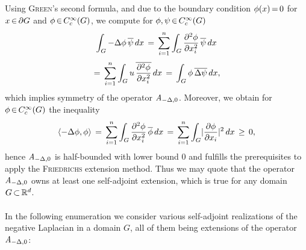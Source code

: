 \documentclass[11pt,twoside]{article}
\def\G{G}
\begin{document}
\begin{itemize}[leftmargin=9mm]
\subparagraph{} %
Using \textsc{Green}'s second formula,
and due to the boundary condition $\phi(x) {\,=\,} 0$ for $x \xeof \partial \G$
and $\phi \xeof \TF$,
we compute for $\phi,\psi \xeof \TF$
\[
\int_{\G} -\Delta \phi \, \overline{\psi} \, dx
\=
\sum_{i=1}^n \int_{\G}
\frac{\partial^2 \phi}{\partial x_i^2} \, \overline{\psi} \, dx
\]
\[
\=
\sum_{i=1}^n \int_{\G}
u \, \overline{\frac{\partial^2 \phi}{\partial x_i^2}} \, dx 
\=
\int_{\G} \phi \, \overline{\Delta \psi} \, dx,
\]
which implies symmetry of the operator $\mathit{A}_{-\Delta,0}$.
Moreover,
we obtain for $\phi \xeof \TF$ the inequality
\[
\scalar{-\Delta \phi}{\phi} \=
\sum_{i=1}^n \int_{\G}
\frac{\partial^2 \phi}{\partial x_i^2} \, \overline{\phi} \, dx
\=
\sum_{i=1}^n \int_{\G} \abs{ \frac{\partial \phi}{\partial x_i}} ^2 \, dx 
\, \geq \, 0,
\]
hence $\mathit{A}_{-\Delta,0}$ is half-bounded with lower bound $0$
and fulfills the prerequisites
to apply the \textsc{Friedrichs} extension method.
Thus we may quote
that the operator $\mathit{A}_{-\Delta,0}$ owns at least one self-adjoint extension,
which is true for any domain $\G \xsubset \Rd$.

\paragraph{} %
In the following enumeration we consider various self-adjoint realizations
of the negative Laplacian in a domain $\G$,
all of them being extensions of the operator $\mathit{A}_{-\Delta,0}$:


\end{itemize}
\end{document}
